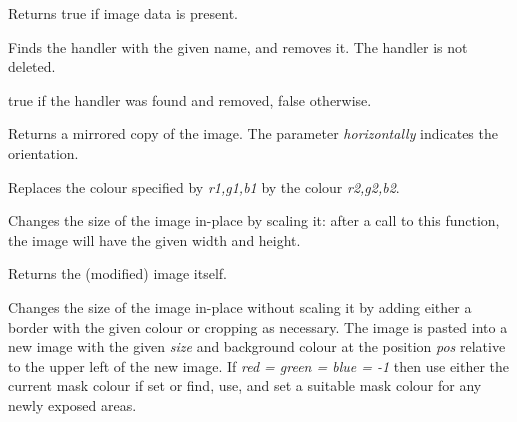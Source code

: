 Returns true if image data is present.


\label{wximageremovehandler}


Finds the handler with the given name, and removes it. The handler
is not deleted.



true if the handler was found and removed, false otherwise.




\label{wximagemirror}


Returns a mirrored copy of the image. The parameter {\it horizontally}
indicates the orientation.


\label{wximagereplace}


Replaces the colour specified by {\it r1,g1,b1} by the colour {\it r2,g2,b2}.


\label{wximagerescale}


Changes the size of the image in-place by scaling it: after a call to this function, 
the image will have the given width and height.

Returns the (modified) image itself.




\label{wximageresize}


Changes the size of the image in-place without scaling it by adding either a border 
with the given colour or cropping as necessary. The image is pasted into a new 
image with the given {\it size} and background colour at the position {\it pos} 
relative to the upper left of the new image. If {\it red = green = blue = -1} 
then use either the  current mask colour if set or find, use, and set a 
suitable mask colour for any newly exposed areas.

